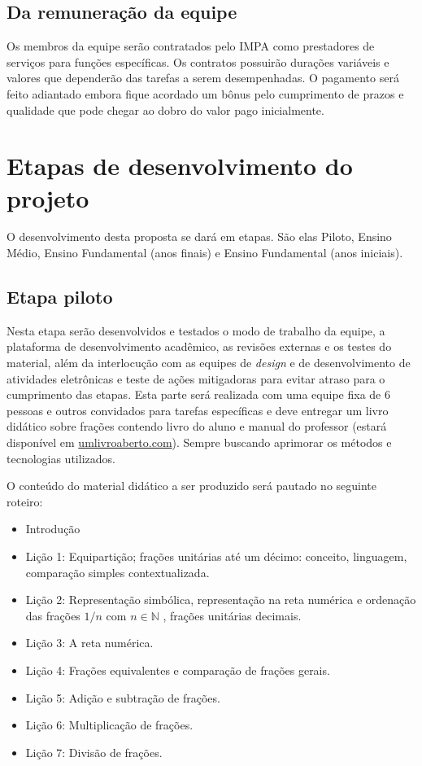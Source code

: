 \documentclass[10 pt]{article}
\begin{document}
\subsection{Da remuneração da equipe}

Os membros da equipe serão contratados pelo IMPA como prestadores de serviços para funções específicas. 
Os contratos possuirão durações variáveis e valores que dependerão das tarefas a serem desempenhadas.
O pagamento será feito adiantado embora fique acordado um bônus pelo cumprimento de prazos e qualidade que pode chegar ao dobro do valor pago inicialmente.


\section{Etapas de desenvolvimento do projeto}
O desenvolvimento desta proposta se dará em etapas. São elas Piloto, Ensino Médio, Ensino Fundamental (anos finais) e Ensino Fundamental (anos iniciais).

\subsection{Etapa piloto}

Nesta etapa serão desenvolvidos e testados o modo de trabalho da equipe, a plataforma de desenvolvimento acadêmico, as revisões externas e os testes do material, além da interlocução com as equipes de {\it design} e de desenvolvimento de atividades eletrônicas e teste de ações mitigadoras para evitar atraso para o cumprimento das etapas. 
Esta parte será realizada com uma equipe fixa de 6 pessoas e outros convidados para tarefas específicas e deve entregar um livro didático sobre frações contendo livro do aluno e manual do professor (estará disponível em \url{umlivroaberto.com}). 
Sempre buscando aprimorar os métodos e tecnologias utilizados.

O conteúdo do material didático a ser produzido será pautado no seguinte roteiro:

\begin{itemize} %
  \item     Introdução
  \item     Lição 1: Equipartição; frações unitárias até um décimo: conceito, linguagem, comparação simples contextualizada.
  \item     Lição 2: Representação simbólica, representação na reta numérica e ordenação das frações     $1/n$  com  $n \in \mathbb{N}$    , frações unitárias decimais.
  \item     Lição 3: A reta numérica.
  \item     Lição 4: Frações equivalentes e comparação de frações gerais.
  \item     Lição 5: Adição e subtração de frações.
  \item     Lição 6: Multiplicação de frações.
  \item     Lição 7: Divisão de frações.
\end{itemize} %
\end{document}
